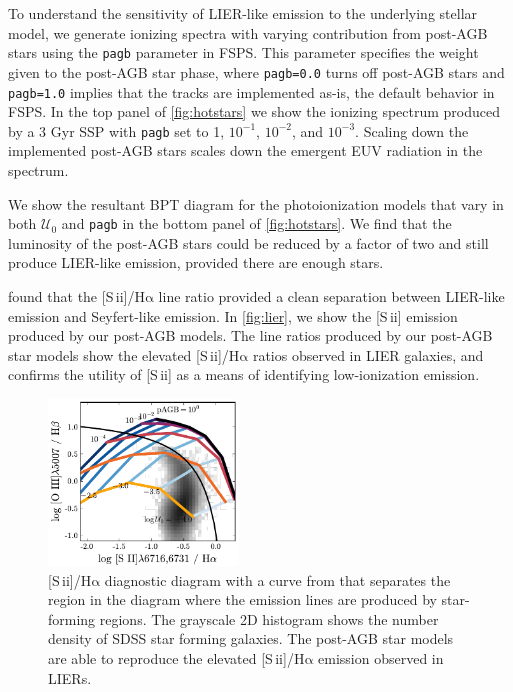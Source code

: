 \documentclass[linenumbers, trackchanges, tighten]{aastex61}%
\newcommand{\Fig}[1]{\autoref{fig:#1}}
\newcommand{\FSPS}{{\sc FSPS}\xspace}
\newcommand{\sii}{[S\,{\sc ii}]\xspace}
\newcommand{\ha}{\ensuremath{\mathrm{H\alpha}}}
\newcommand{\U}{\ensuremath{\mathcal{U}_{0}}}
\begin{document}
To understand the sensitivity of LIER-like emission to the underlying stellar model, we generate ionizing spectra with varying contribution from post-AGB stars using the {\tt pagb} parameter in \FSPS. This parameter specifies the weight given to the post-AGB star phase, where {\tt pagb=0.0} turns off post-AGB stars and {\tt pagb=1.0} implies that the \citet{Vassiliadis} tracks are implemented as-is, the default behavior in \FSPS. In the top panel of \Fig{hotstars} we show the ionizing spectrum produced by a 3 Gyr SSP with {\tt pagb} set to 1, $10^{-1}$, $10^{-2}$, and $10^{-3}$. Scaling down the implemented post-AGB stars scales down the emergent EUV radiation in the spectrum.

We show the resultant BPT diagram for the photoionization models that vary in both \U{} and {\tt pagb} in the bottom panel of \Fig{hotstars}. We find that the luminosity of the post-AGB stars could be reduced by a factor of two and still produce LIER-like emission, provided there are enough stars.

\citet{Belfiore16} found that the \sii{}/\ha{} line ratio provided a clean separation between LIER-like emission and Seyfert-like emission. In \Fig{lier}, we show the \sii{} emission produced by our post-AGB models. The line ratios produced by our post-AGB star models show the elevated \sii{}/\ha{} ratios observed in LIER galaxies, and confirms the utility of \sii{} as a means of identifying low-ionization emission.

\begin{figure}[!htbp]
  \begin{centering}
    \includegraphics[width=0.45\textwidth]{f29.pdf}
    \caption{\sii{}/\ha{} diagnostic diagram with a curve from \citet{Kewley01} that separates the region in the diagram where the emission lines are produced by star-forming regions. The grayscale 2D histogram shows the number density of SDSS star forming galaxies. The post-AGB star models are able to reproduce the elevated \sii{}/\ha{} emission observed in LIERs.}
    \label{fig:lier}
  \end{centering}
\end{figure}
\end{document}
